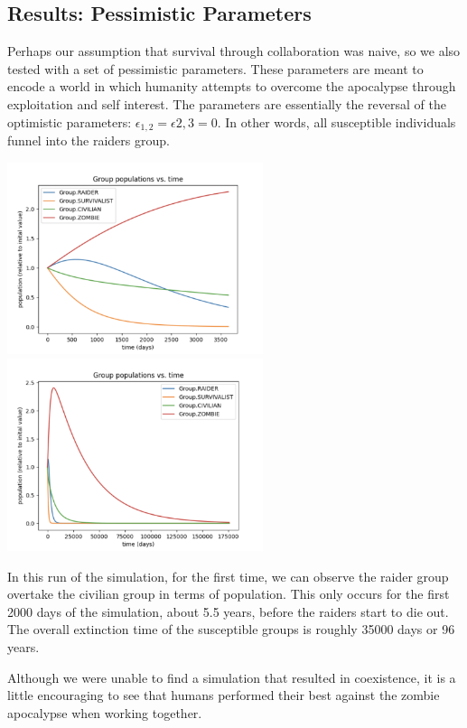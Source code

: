 \documentclass{article}
\begin{document}
\subsection{Results: Pessimistic Parameters}

Perhaps our assumption that survival through collaboration was naive, so we also tested with a set of pessimistic parameters. These parameters are meant to encode a world in which humanity attempts to overcome the apocalypse through exploitation and self interest. The parameters are essentially the reversal of the optimistic parameters: $\epsilon_{1,2} = \epsilon{2,3} = 0$. In other words, all susceptible individuals funnel into the raiders group.

\begin{center}
    \includegraphics[width=7.5cm]{pessemistic_10_year.png}
    \includegraphics[width=7.5cm]{pessemistic_until_extinction.png}
\end{center}

In this run of the simulation, for the first time, we can observe the raider group overtake the civilian group in terms of population. This only occurs for the first 2000 days of the simulation, about 5.5 years, before the raiders start to die out. The overall extinction time of the susceptible groups is roughly 35000 days or 96 years.

Although we were unable to find a simulation that resulted in coexistence, it is a little encouraging to see that humans performed their best against the zombie apocalypse when working together.
\end{document}
